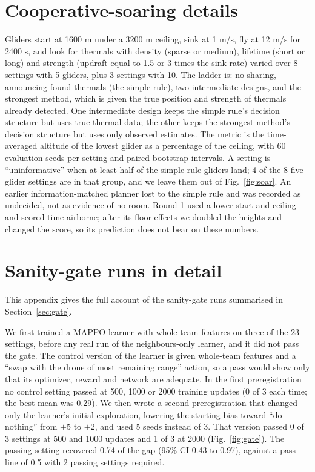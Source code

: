 \documentclass[11pt]{article}
\begin{document}
\section{Cooperative-soaring details}
\label{app:soaring}

Gliders start at 1600 m under a 3200 m ceiling, sink at 1 m/s, fly at 12 m/s for 2400 s, and look for thermals with density (sparse or medium), lifetime (short or long) and strength (updraft equal to 1.5 or 3 times the sink rate) varied over 8 settings with 5 gliders, plus 3 settings with 10.
The ladder is: no sharing, announcing found thermals (the simple rule), two intermediate designs, and the strongest method, which is given the true position and strength of thermals already detected.
One intermediate design keeps the simple rule's decision structure but uses true thermal data; the other keeps the strongest method's decision structure but uses only observed estimates.
The metric is the time-averaged altitude of the lowest glider as a percentage of the ceiling, with 60 evaluation seeds per setting and paired bootstrap intervals.
A setting is ``uninformative'' when at least half of the simple-rule gliders land; 4 of the 8 five-glider settings are in that group, and we leave them out of Fig.~\ref{fig:soar}.
An earlier information-matched planner lost to the simple rule and was recorded as undecided, not as evidence of no room. Round 1 used a lower start and ceiling and scored time airborne; after its floor effects we doubled the heights and changed the score, so its prediction does not bear on these numbers.

\section{Sanity-gate runs in detail}
\label{app:gate}

This appendix gives the full account of the sanity-gate runs summarised in Section~\ref{sec:gate}.

We first trained a MAPPO learner with whole-team features on three of the 23 settings, before any real run of the neighbours-only learner, and it did not pass the gate.
The control version of the learner is given whole-team features and a ``swap with the drone of most remaining range'' action, so a pass would show only that its optimizer, reward and network are adequate.
In the first preregistration no control setting passed at 500, 1000 or 2000 training updates (0 of 3 each time; the best mean was 0.29).
We then wrote a second preregistration that changed only the learner's initial exploration, lowering the starting bias toward ``do nothing'' from $+5$ to $+2$, and used 5 seeds instead of 3.
That version passed 0 of 3 settings at 500 and 1000 updates and 1 of 3 at 2000 (Fig.~\ref{fig:gate}).
The passing setting recovered 0.74 of the gap (95\% CI 0.43 to 0.97), against a pass line of 0.5 with 2 passing settings required.
\end{document}
